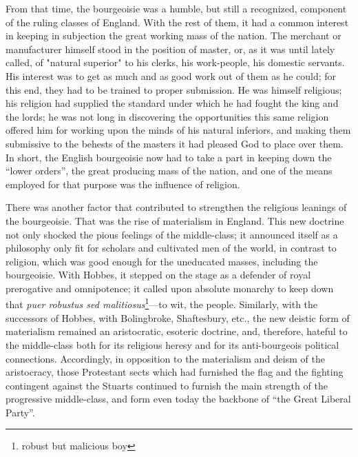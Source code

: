 From that time, the bourgeoisie was a humble, but still a recognized, component
of the ruling classes of England. With the rest of them, it had a common
interest in keeping in subjection the great working mass of the nation. The
merchant or manufacturer himself stood in the position of master, or, as it was
until lately called, of "natural superior" to his clerks, his work-people, his
domestic servants. His interest was to get as much and as good work out of them
as he could; for this end, they had to be trained to proper submission. He was
himself religious; his religion had supplied the standard under which he had
fought the king and the lords; he was not long in discovering the opportunities
this same religion offered him for working upon the minds of his natural
inferiors, and making them submissive to the behests of the masters it had
pleased God to place over them. In short, the English bourgeoisie now had to
take a part in keeping down the ``lower orders'', the great producing mass of
the nation, and one of the means employed for that purpose was the influence of
religion. 

There was another factor that contributed to strengthen the religious leanings
of the bourgeoisie. That was the rise of materialism in England. This new
doctrine not only shocked the pious feelings of the middle-class; it announced
itself as a philosophy only fit for scholars and cultivated men of the world,
in contrast to religion, which was good enough for the uneducated masses,
including the bourgeoisie. With Hobbes, it stepped on the stage as a defender of
royal prerogative and omnipotence; it called upon absolute monarchy to keep down
that \emph{puer robustus sed malitiosus}\footnote{robust but malicious boy}---to
wit, the people. Similarly, with the successors of Hobbes, with Bolingbroke,
Shaftesbury, etc., the new deistic form of materialism remained an aristocratic,
esoteric doctrine, and, therefore, hateful to the middle-class both for its
religious heresy and for its anti-bourgeois political connections. Accordingly,
in opposition to the materialism and deism of the aristocracy, those
Protestant sects which had furnished the flag and the fighting contingent
against the Stuarts continued to furnish the main strength of the progressive
middle-class, and form even today the backbone of ``the Great Liberal Party''.

